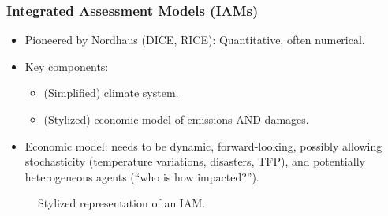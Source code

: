 \documentclass[aspectratio=1610]{beamer}
\begin{document}
\begin{frame}
\frametitle{Integrated Assessment Models (IAMs)}

\begin{itemize}
\item Pioneered by Nordhaus (DICE, RICE): Quantitative, often numerical.
\item Key components:
\begin{itemize}
    \item (Simplified) climate system.
    \item (Stylized) economic model of emissions AND damages.
\end{itemize}

\item Economic model: needs to be dynamic, forward-looking, possibly allowing stochasticity (temperature variations, disasters, TFP), and potentially heterogeneous agents (``who is how impacted?'').
\end{itemize}
\vfill
%
\begin{figure}[h]
\centering
{}
\caption{Stylized representation of an IAM.}
\label{fig:IAM_stylized}
\end{figure}

\end{frame}

\end{document}
